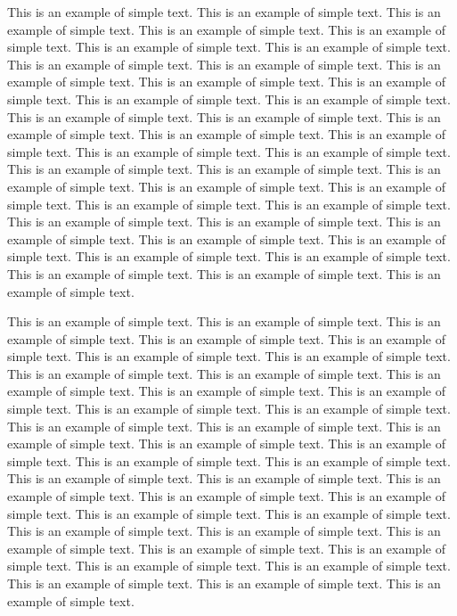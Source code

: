 \documentclass[11pt]{now}
\begin{document}
                   This is an example of simple text. This is an
example of simple text.  This is an example of simple text. This is
an example of simple text.  This is an example of simple text. This
is an example of simple text.  This is an example of simple text.
This is an example of simple text.  This is an example of simple
text. This is an example of simple text.  This is an example of
simple text. This is an example of simple text.  This is an example
of simple text. This is an example of simple text.  This is an
example of simple text. This is an example of simple text.  This is
an example of simple text. This is an example of simple text.  This
is an example of simple text. This is an example of simple text.
This is an example of simple text. This is an example of simple text.
This is an example of simple text. This is an example of simple text.
This is an example of simple text. This is an example of simple text.
This is an example of simple text. This is an example of simple text.
This is an example of simple text. This is an example of simple text.
This is an example of simple text. This is an example of simple text.
This is an example of simple text. This is an example of simple text.
This is an example of simple text. This is an example of simple text.
This is an example of simple text. This is an example of simple text.

This is an example of simple text. This is an
example of simple text.  This is an example of simple text. This is
an example of simple text.  This is an example of simple text. This
is an example of simple text.  This is an example of simple text.
This is an example of simple text.  This is an example of simple
text. This is an example of simple text.  This is an example of
simple text. This is an example of simple text.  This is an example
of simple text. This is an example of simple text.  This is an
example of simple text. This is an example of simple text.  This is
an example of simple text. This is an example of simple text.  This
is an example of simple text. This is an example of simple text.
This is an example of simple text. This is an example of simple text.
This is an example of simple text. This is an example of simple text.
This is an example of simple text. This is an example of simple text.
This is an example of simple text. This is an example of simple text.
This is an example of simple text. This is an example of simple text.
This is an example of simple text. This is an example of simple text.
This is an example of simple text. This is an example of simple text.
This is an example of simple text. This is an example of simple text.
This is an example of simple text. This is an example of simple text.
\end{document}
